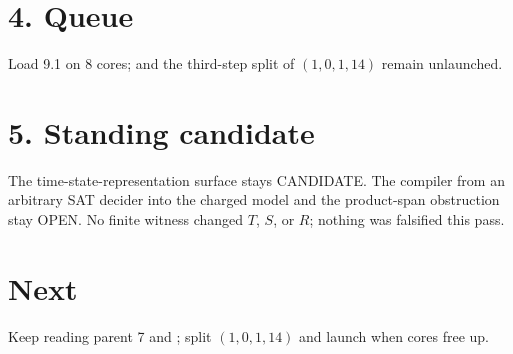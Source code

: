 \documentclass[11pt]{article}
\begin{document}
\section*{4. Queue}
Load 9.1 on 8 cores;  and the third-step split of $(1,0,1,14)$ remain unlaunched.

\section*{5. Standing candidate}
The time-state-representation surface stays CANDIDATE. The compiler from an arbitrary SAT decider into the charged model and the product-span obstruction stay OPEN. No finite witness changed $T$, $S$, or $R$; nothing was falsified this pass.

\section*{Next}
Keep reading parent 7 and ; split $(1,0,1,14)$ and launch  when cores free up.
\end{document}
